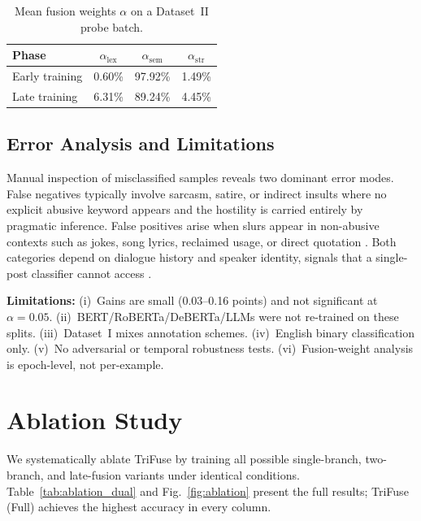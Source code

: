 \documentclass[10pt,twocolumn,a4paper]{article}
\begin{document}
\begin{table}[!t]
\caption{Mean fusion weights $\alpha$ on a Dataset~II probe batch.}
\label{tab:fusion_weights}
\centering
\begin{tabular}{|l|c|c|c|}
\hline
Phase & $\alpha_{\mathrm{lex}}$ & $\alpha_{\mathrm{sem}}$ & $\alpha_{\mathrm{str}}$ \\
\hline
Early training & 0.60\% & 97.92\% & 1.49\% \\
Late training & 6.31\% & 89.24\% & 4.45\% \\
\hline
\end{tabular}
\end{table}

\subsection{Error Analysis and Limitations}\label{subsec:limitations}

Manual inspection of misclassified samples reveals two dominant error modes. False negatives typically involve sarcasm, satire, or indirect insults where no explicit abusive keyword appears and the hostility is carried entirely by pragmatic inference. False positives arise when slurs appear in non-abusive contexts such as jokes, song lyrics, reclaimed usage, or direct quotation \citep{ref37,ref2}. Both categories depend on dialogue history and speaker identity, signals that a single-post classifier cannot access \citep{ref38}.

\textbf{Limitations:} (i)~Gains are small (0.03--0.16 points) and not significant at $\alpha{=}0.05$. (ii)~BERT/RoBERTa/DeBERTa/LLMs were not re-trained on these splits. (iii)~Dataset~I mixes annotation schemes. (iv)~English binary classification only. (v)~No adversarial or temporal robustness tests. (vi)~Fusion-weight analysis is epoch-level, not per-example.

\section{Ablation Study}\label{sec:ablation}

We systematically ablate TriFuse by training all possible single-branch, two-branch, and late-fusion variants under identical conditions. Table~\ref{tab:ablation_dual} and Fig.~\ref{fig:ablation} present the full results; TriFuse (Full) achieves the highest accuracy in every column.
\end{document}
